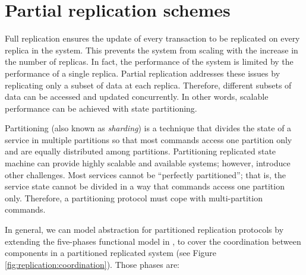 
\section{Partial replication schemes}

Full replication ensures the update of every transaction to be replicated on
every replica in the system. This prevents the system from scaling with the
increase in the number of replicas. In fact, the performance of the system is
limited by the performance of a single replica. Partial replication addresses
these issues by replicating only a subset of data at each replica. Therefore,
different subsets of data can be accessed and updated concurrently. In other
words, scalable performance can be achieved with state partitioning.

Partitioning (also known as \emph{sharding}) is a technique that divides the
state of a service in multiple partitions so that most commands access one
partition only and are equally distributed among partitions. Partitioning
replicated state machine can provide highly scalable and available systems;
however, introduce other challenges. Most services cannot be ``perfectly
partitioned''; that is, the service state cannot be divided in a way that
commands access one partition only. Therefore, a partitioning protocol must cope
with multi-partition commands.


In general, we can model abstraction for partitioned replication protocols by
extending the five-phases functional model in \cite{pedone:replication}, to
cover the coordination between components in a partitioned replicated system
(see Figure \ref{fig:replication:coordination}). Those phases are:


